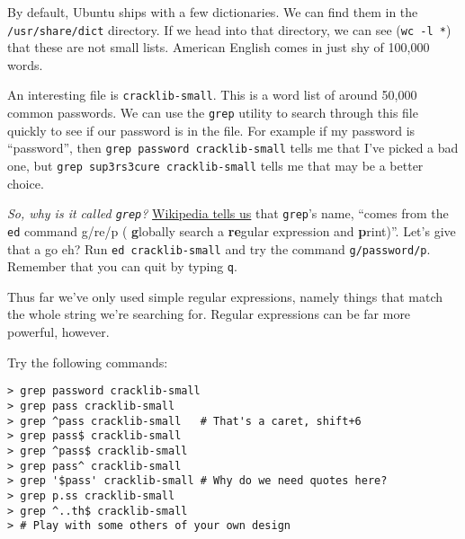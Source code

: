 \documentclass{article}
\begin{document}
\begin{minipage}{0.6\textwidth}
By default, Ubuntu ships with a few dictionaries. We can find them in the
\texttt{/usr/share/dict} directory. If we head into that directory, we can see
(\texttt{wc~-l~*}) that these are not small lists. American English comes in
just shy of 100,000 words.

\medskip
\noindent
An interesting file is \texttt{cracklib-small}. This is a word list of around
50,000 common passwords. We can use the \texttt{grep} utility to search
through this file quickly to see if our password is in the file. For example
if my password is ``password'', then \texttt{grep~password~cracklib-small} tells
me that I've picked a bad one, but \texttt{grep~sup3rs3cure~cracklib-small}
tells me that may be a better choice.

\medskip \noindent \textit{So, why is it called \texttt{grep}?}
\href{https://en.wikipedia.org/wiki/Grep}{Wikipedia tells us} that
\texttt{grep}'s name, ``comes from the \texttt{ed} command g/re/p ({\bf
g}lobally search a {\bf re}gular expression and {\bf p}rint)''. Let's give
that a go eh?  Run \texttt{ed~cracklib-small} and try the command
\texttt{g/password/p}. Remember that you can quit by typing \texttt{q}.


\medskip
\noindent
Thus far we've only used simple regular expressions, namely things that match
the whole string we're searching for. Regular expressions can be far more
powerful, however.

\medskip
\noindent
Try the following commands:
\begin{lstlisting}
> grep password cracklib-small
> grep pass cracklib-small
> grep ^pass cracklib-small   # That's a caret, shift+6
> grep pass$ cracklib-small
> grep ^pass$ cracklib-small
> grep pass^ cracklib-small
> grep '$pass' cracklib-small # Why do we need quotes here?
> grep p.ss cracklib-small
> grep ^..th$ cracklib-small
> # Play with some others of your own design
\end{lstlisting}


\end{minipage}
\begin{minipage}{0.05\textwidth}
  ~~~~
\end{minipage}
\end{document}
